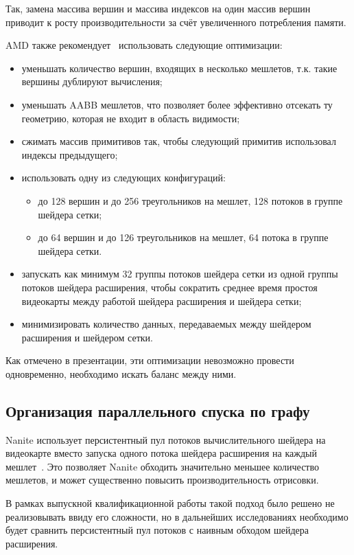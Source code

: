 Так, замена массива вершин и массива индексов на один массив вершин приводит к росту производительности за счёт увеличенного потребления памяти.

AMD также рекомендует~\cite{AMDMeshletsRecommendations} использовать следующие оптимизации:
\begin{itemize}
    \item уменьшать количество вершин, входящих в несколько мешлетов, т.к. такие вершины дублируют вычисления;
    \item уменьшать AABB мешлетов, что позволяет более эффективно отсекать ту геометрию, которая не входит в область видимости;
    \item сжимать массив примитивов так, чтобы следующий примитив использовал индексы предыдущего;
    \item использовать одну из следующих конфигураций:
    \begin{itemize}
        \item до 128 вершин и до 256 треугольников на мешлет, 128 потоков в группе шейдера сетки;
        \item до 64 вершин и до 126 треугольников на мешлет, 64 потока в группе шейдера сетки.
    \end{itemize}
    \item запускать как минимум 32 группы потоков шейдера сетки из одной группы потоков шейдера расширения, чтобы сократить среднее время простоя видеокарты между работой шейдера расширения и шейдера сетки;
    \item минимизировать количество данных, передаваемых между шейдером расширения и шейдером сетки.
\end{itemize}

Как отмечено в презентации, эти оптимизации невозможно провести одновременно, необходимо искать баланс между ними.

\subsection*{Организация параллельного спуска по графу}
Nanite использует персистентный пул потоков вычислительного шейдера на видеокарте вместо запуска одного потока шейдера расширения на каждый мешлет~\cite{KarisNanite}.
Это позволяет Nanite обходить значительно меньшее количество мешлетов, и может существенно повысить производительность отрисовки.

В рамках выпускной квалификационной работы такой подход было решено не реализовывать ввиду его сложности, но в дальнейших исследованиях необходимо будет сравнить персистентный пул потоков с наивным обходом шейдера расширения.

